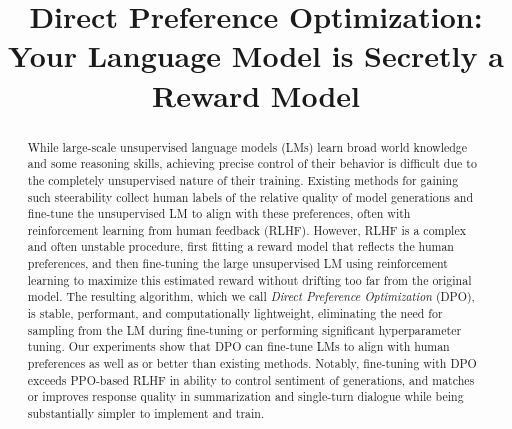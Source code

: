 \title{Direct Preference Optimization: Your Language Model is Secretly a Reward Model}

\begin{abstract}
While large-scale unsupervised language models (LMs) learn broad world knowledge and some reasoning skills, achieving precise control of their behavior is difficult due to the completely unsupervised nature of their training.
Existing methods for gaining such steerability collect human labels of the relative quality of model generations and fine-tune the unsupervised LM to align with these preferences, often with reinforcement learning from human feedback (RLHF).
However, RLHF is a complex and often unstable procedure, first fitting a reward model that reflects the human preferences, and then fine-tuning the large unsupervised LM using reinforcement learning to maximize this estimated reward without drifting too far from the original model.
The resulting algorithm, which we call \textit{Direct Preference Optimization} (DPO), is stable, performant, and computationally lightweight, eliminating the need for  sampling from the LM during fine-tuning or performing significant hyperparameter tuning.
Our experiments show that DPO can fine-tune LMs to align with human preferences as well as or better than existing methods. Notably, fine-tuning with DPO exceeds PPO-based RLHF in ability to control sentiment of generations, and matches or improves response quality in summarization and single-turn dialogue while being substantially simpler to implement and train.
\end{abstract}

